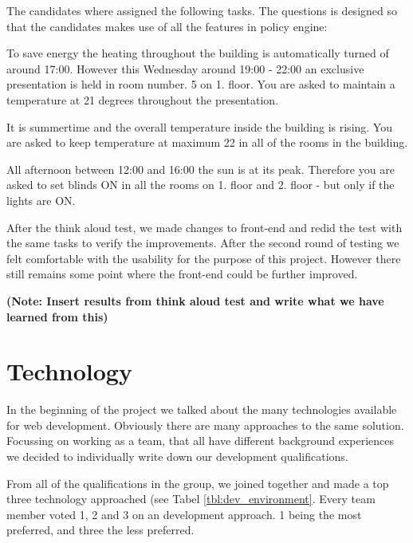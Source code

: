 The candidates where assigned the following tasks. The questions is designed so that the candidates makes use of all the features in policy engine:

\begin{framed}
To save energy the heating throughout the building is automatically turned of around 17:00. However this Wednesday around 19:00 - 22:00 an exclusive presentation is held in room number. 5 on 1. floor.
You are asked to maintain a temperature at 21 degrees throughout the presentation.

\end{framed}


\begin{framed}
It is summertime and the overall temperature inside the building is rising. You are asked to keep temperature at maximum 22 in all of the rooms in the  building.
\end{framed}


\begin{framed}
All afternoon between 12:00 and 16:00 the sun is at its peak. Therefore you are asked to set blinds ON in all the rooms on 1. floor and 2. floor - but only if the lights are ON.
\end{framed}

After the think aloud test, we made changes to front-end and redid the test with the same tasks to verify the improvements. 
After the second round of testing we felt comfortable with the usability for the purpose of this project. However there still remains some point where the front-end could be further improved.

\textbf{(Note: Insert results from think aloud test and write what we have learned from this)}

\section{Technology}
In the beginning of the project we talked about the many technologies available for web development. Obviously there are many approaches to the same solution. Focussing on working as a team, that all have different background experiences we decided to individually write down our development qualifications.

From all of the qualifications in the group, we joined together and made a top three technology approached (see Tabel \ref{tbl:dev_environment}. Every team member voted 1, 2 and 3 on an development approach. 1 being the most preferred, and three the less preferred. 

